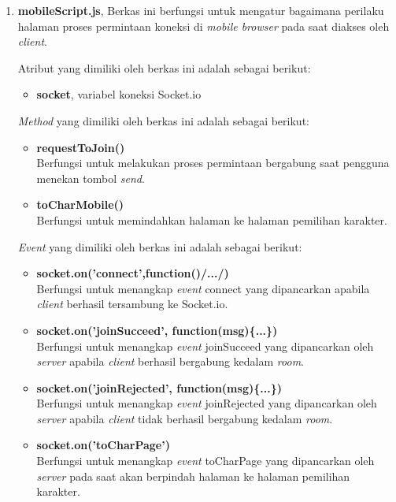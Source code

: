 \begin{enumerate}
\begin{enumerate}
\begin{enumerate}
			\item \textbf{mobileScript.js}, Berkas ini berfungsi untuk mengatur bagaimana perilaku halaman proses permintaan koneksi di \textit{mobile browser} pada saat diakses oleh \textit{client}.
			
			Atribut yang dimiliki oleh berkas ini adalah sebagai berikut:
			\begin{itemize}
				\item \textbf{socket}, variabel koneksi Socket.io
			\end{itemize}
			
			\textit{Method} yang dimiliki oleh berkas ini adalah sebagai berikut:
			\begin{itemize}
				\item \textbf{requestToJoin()} \\ 
				Berfungsi untuk melakukan proses permintaan bergabung saat pengguna menekan tombol \textit{send}.
				
				\item \textbf{toCharMobile()} \\
				Berfungsi untuk memindahkan halaman ke halaman pemilihan karakter.
			\end{itemize}
			
			\textit{Event} yang dimiliki oleh berkas ini adalah sebagai berikut:
			\begin{itemize}
				\item \textbf{socket.on('connect',function()/{.../})} \\
				Berfungsi untuk menangkap \textit{event} connect yang dipancarkan apabila \textit{client} berhasil tersambung ke Socket.io.
				
				\item \textbf{socket.on('joinSucceed', function(msg)\{...\})} \\
				Berfungsi untuk menangkap \textit{event} joinSucceed yang dipancarkan oleh \textit{server} apabila \textit{client} berhasil bergabung kedalam \textit{room}.
				
				\item \textbf{socket.on('joinRejected', function(msg)\{...\})} \\
				Berfungsi untuk menangkap \textit{event} joinRejected yang dipancarkan oleh \textit{server} apabila \textit{client} tidak berhasil bergabung kedalam \textit{room}.
				
				\item \textbf{socket.on('toCharPage')} \\
				Berfungsi untuk menangkap \textit{event} toCharPage yang dipancarkan oleh \textit{server} pada saat akan berpindah halaman ke halaman pemilihan karakter.
			\end{itemize}
			

\end{enumerate}
\end{enumerate}
\end{enumerate}
